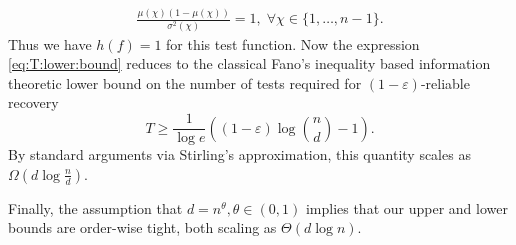 \documentclass[onecolumn,letterpaper]{IEEEtran}
\newcommand{\plsize}{{\chi}}
\newcommand{\mean}{{\mu}}
\newcommand{\var}{{\sigma^{2}}}
\newcommand{\fh}{{h(f)}}
\begin{document}
\begin{IEEEproof}
\begin{align*}
     \frac{\mean(\plsize)(1-\mean(\plsize))}{\var(\plsize)}=1, \; \forall \plsize\in \{1,\dots,n-1\}.
\end{align*}
Thus we have $\fh=1$ for this test function.
Now the expression \eqref{eq:T:lower:bound} reduces to the classical Fano's inequality based information theoretic lower bound \cite{sid2014} on the number of tests required for $(1-\varepsilon)$-reliable recovery
\begin{equation*}
    T \geq \frac{1}{\log e}\left((1-\varepsilon)\log\binom{n}{d} - 1 \right).
\end{equation*}
By standard arguments via Stirling’s approximation, this quantity scales as $\Omega\left(d\log\frac{n}{d}\right)$.  


Finally, the assumption that $ d= n^{\theta},\theta\in(0,1)$ implies that our upper and lower bounds are order-wise tight, both scaling as $\Theta \left(d\log n\right)$.
\end{IEEEproof}
\end{document}

